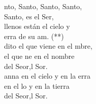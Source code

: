 \documentclass[12pt]{article}
\begin{document}
\begin{multicols*}{2}
\begin{cancion}%
	nto, Santo, Santo, Santo,\\
	Santo, es el Ser,\\
llenos están el cielo y \\
	erra de su am. (**)\\
	dito el que viene en el mbre,\\
	el que ne en el nombre \\
	del Seor,l Sor. \\
	anna en el cielo y en la erra\\
	en el lo y en la tierra\\
	del Seor,l Sor. \\
\end{cancion}%


\end{multicols*}
\end{document}
